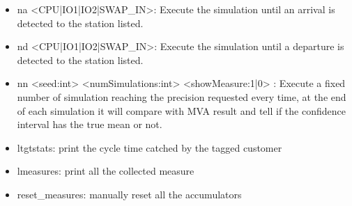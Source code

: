 \documentclass[12pt,a4paper]{article}
\begin{document}
\begin{itemize}
    \item na <CPU|IO1|IO2|SWAP\_IN>: Execute the simulation until an arrival is detected to the station listed.
    \item nd <CPU|IO1|IO2|SWAP\_IN>: Execute the simulation until a departure is detected to the station listed.
    \item nn <seed:int> <numSimulations:int> <showMeasure:1|0> : Execute a fixed number of simulation reaching the precision requested every time, at the end of each simulation it will compare with MVA result and tell if the confidence interval has the true mean or not.
    \item ltgtstats: print the cycle time catched by the tagged customer
    \item lmeasures: print all the collected measure
    \item reset\_measures: manually reset all the accumulators

\end{itemize}
\end{document}
